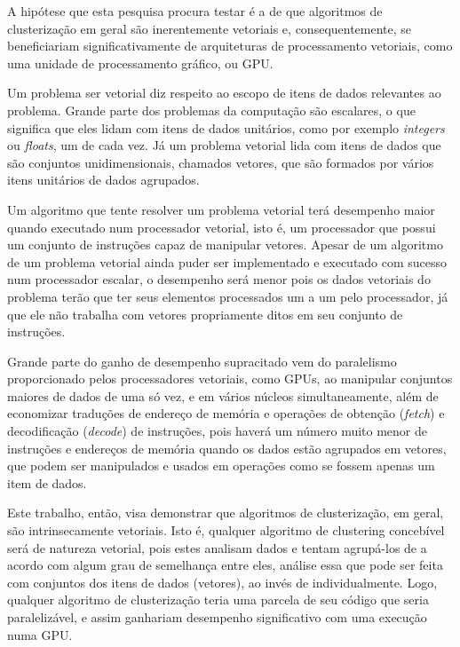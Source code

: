\documentclass[12pt, %
openright, 
oneside, %
a4paper,    %
brazil]{facom-ufu-abntex2}
\begin{document}
A hipótese que esta pesquisa procura testar é a de que algoritmos de clusterização em geral são inerentemente vetoriais e, consequentemente, se beneficiariam significativamente de arquiteturas de processamento vetoriais, como uma unidade de processamento gráfico, ou GPU.

Um problema ser vetorial diz respeito ao escopo de itens de dados relevantes ao problema. Grande parte dos problemas da computação são escalares, o que significa que eles lidam com itens de dados unitários, como por exemplo \textit{integers} ou \textit{floats}, um de cada vez. Já um problema vetorial lida com itens de dados que são conjuntos unidimensionais, chamados vetores, que são formados por vários itens unitários de dados agrupados.

Um algoritmo que tente resolver um problema vetorial terá desempenho maior quando executado num processador vetorial, isto é, um processador que possui um conjunto de instruções capaz de manipular vetores. Apesar de um algoritmo de um problema vetorial ainda puder ser implementado e executado com sucesso num processador escalar, o desempenho será menor pois os dados vetoriais do problema terão que ter seus elementos processados um a um pelo processador, já que ele não trabalha com vetores propriamente ditos em seu conjunto de instruções.

Grande parte do ganho de desempenho supracitado vem do paralelismo proporcionado pelos processadores vetoriais, como GPUs, ao manipular conjuntos maiores de dados de uma só vez, e em vários núcleos simultaneamente, além de economizar traduções de endereço de memória e operações de obtenção (\textit{fetch}) e decodificação (\textit{decode}) de instruções, pois haverá um número muito menor de instruções e endereços de memória quando os dados estão agrupados em vetores, que podem ser manipulados e usados em operações como se fossem apenas um item de dados.

Este trabalho, então, visa demonstrar que algoritmos de clusterização, em geral, são intrinsecamente vetoriais. Isto é, qualquer algoritmo de clustering concebível será de natureza vetorial, pois estes analisam dados e tentam agrupá-los de a acordo com algum grau de semelhança entre eles, análise essa que pode ser feita com conjuntos dos itens de dados (vetores), ao invés de individualmente. Logo, qualquer algoritmo de clusterização teria uma parcela de seu código que seria paralelizável, e assim ganhariam desempenho significativo com uma execução numa GPU.

\end{document}
